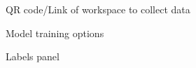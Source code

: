 \begin{figure}[ht]
    \centering
    \caption{\gls{QR code}/Link of \gls{workspace} to collect data}
    \label{fig:workspace-link}
\end{figure}

\begin{figure}[ht]
    \centering
    \caption{Model training options}
    \label{fig:training-options}
\end{figure}

\begin{figure}[ht]
    \centering
    \caption{Labels panel}
    \label{fig:labels-panel}
\end{figure}


